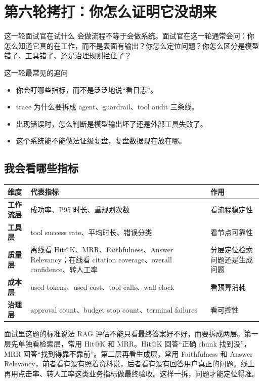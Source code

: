 \documentclass[12pt]{article}
\begin{document}
\section{第六轮拷打：你怎么证明它没胡来}

\begin{summaryBox}{这一轮面试官在试什么}
会做流程不等于会做系统。面试官在这一轮通常会问：你怎么知道它真的在工作，而不是表面有输出？你怎么定位问题？你怎么区分是模型错了、工具错了、还是治理规则拦住了？
\end{summaryBox}

\begin{qaBox}{这一轮最常见的追问}
\begin{itemize}[leftmargin=2em]
  \item 你会盯哪些指标，而不是泛泛地说“看日志”。
  \item trace 为什么要拆成 agent、guardrail、tool audit 三条线。
  \item 出现错误时，怎么判断是模型输出坏了还是外部工具失败了。
  \item 这个系统能不能做法证级复盘，复盘数据现在放在哪。
\end{itemize}
\end{qaBox}

\subsection{我会看哪些指标}
\begin{center}
\small
\begin{tabularx}{\textwidth}{>{\bfseries}lXX}
\toprule
维度 & 代表指标 & 作用 \\
\midrule
工作流层 & 成功率、P95 时长、重规划次数 & 看流程稳定性 \\
工具层 & tool success rate、平均时长、错误分类 & 看节点可靠性 \\
质量层 & 离线看 Hit@K、MRR、Faithfulness、Answer Relevancy；在线看 citation coverage、overall confidence、转人工率 & 分层定位检索问题还是生成问题 \\
成本层 & used tokens、used cost、tool calls、wall clock & 看预算消耗 \\
治理层 & approval count、budget stop count、terminal failures & 看可控性 \\
\bottomrule
\end{tabularx}
\end{center}

\begin{summaryBox}{面试里这题的标准说法}
RAG 评估不能只看最终答案好不好，而要拆成两层。第一层先单独看检索层，常用 Hit@K 和 MRR。Hit@K 回答“正确 chunk 找到没”，MRR 回答“找到得靠不靠前”。第二层再看生成层，常用 Faithfulness 和 Answer Relevancy，前者看有没有照着资料说，后者看有没有回答用户真正的问题。线上再用点击率、转人工率这类业务指标做最终验收。这样一拆，问题才能定位得准。
\end{summaryBox}
\end{document}
